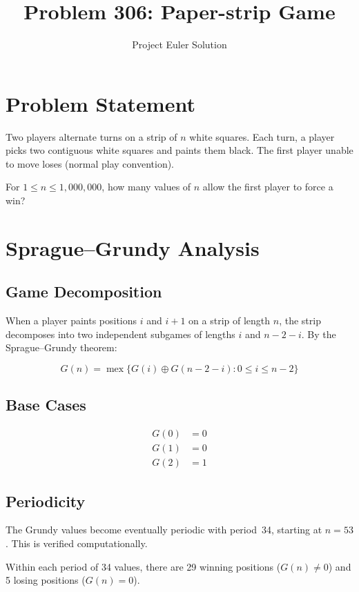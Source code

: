 \documentclass[12pt]{article}
\title{Problem 306: Paper-strip Game}
\author{Project Euler Solution}
\date{}
\begin{document}
\maketitle

\section{Problem Statement}
Two players alternate turns on a strip of $n$ white squares. Each turn, a player picks two contiguous white squares and paints them black. The first player unable to move loses (normal play convention).

For $1 \leq n \leq 1{,}000{,}000$, how many values of $n$ allow the first player to force a win?

\section{Sprague--Grundy Analysis}

\subsection{Game Decomposition}
When a player paints positions $i$ and $i+1$ on a strip of length $n$, the strip decomposes into two independent subgames of lengths $i$ and $n-2-i$. By the Sprague--Grundy theorem:

\begin{equation}
    G(n) = \operatorname{mex}\{G(i) \oplus G(n-2-i) : 0 \leq i \leq n-2\}
\end{equation}

\subsection{Base Cases}
\begin{align}
    G(0) &= 0 \\
    G(1) &= 0 \\
    G(2) &= 1
\end{align}

\subsection{Periodicity}
The Grundy values become eventually periodic with period~34, starting at $n = 53$. This is verified computationally.

Within each period of 34 values, there are 29 winning positions ($G(n) \neq 0$) and 5 losing positions ($G(n) = 0$).
\end{document}
